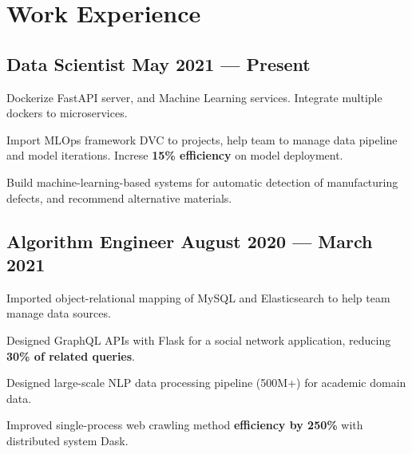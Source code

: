 \section{Work Experience}

\subsection*{Data Scientist \hfill May 2021 --- Present} 
    \begin{zitemize}
        \item Dockerize FastAPI server, and Machine Learning services. Integrate multiple dockers to microservices.
        \item Import MLOps framework DVC to projects, help team to manage data pipeline and model iterations. Increse \textbf{15\% efficiency} on model deployment.
        \item Build machine-learning-based systems for automatic detection of manufacturing defects, and recommend alternative materials.
    \end{zitemize}


\subsection*{Algorithm Engineer \hfill August 2020 --- March 2021} 
    \begin{zitemize}
        \item Imported object-relational mapping of MySQL and Elasticsearch to help team manage data sources.
        \item Designed GraphQL APIs with Flask for a social network application, reducing \textbf{30\% of related queries}.
        \item Designed large-scale NLP data processing pipeline (500M+) for academic domain data.
        \item Improved single-process web crawling method \textbf{efficiency by 250\%} with distributed system Dask.
    \end{zitemize}


